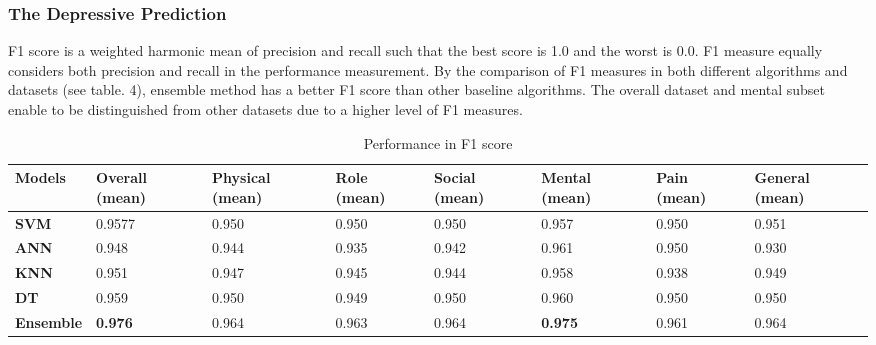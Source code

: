 \documentclass[10pt,journal,compsoc]{IEEEtran}
\begin{document}
\subsubsection{The Depressive Prediction}
F1 score is a weighted harmonic mean of precision and recall such that the best score is 1.0 and the worst is 0.0. F1 measure equally considers both precision and recall in the performance measurement. By the comparison of F1 measures in both different algorithms and datasets (see table. 4), ensemble method has a better F1 score than other baseline algorithms. The overall dataset and mental subset enable to be distinguished from other datasets due to a higher level of F1 measures.
\begin{table}[ht]
\begin{adjustwidth}{-1.5cm}{}
\begin{tabular}{|C{2cm}|C{1.5cm}|C{2cm}|C{1.5cm}|C{1.5cm}|C{1.5cm}|C{1.5cm}|C{2cm}|}
\hline
{} 
{\color[HTML]{333333} \textbf{Models}} & {\color[HTML]{333333} \textbf{Overall (mean)}} & {\color[HTML]{333333} \textbf{Physical (mean)}} & {\color[HTML]{333333} \textbf{Role (mean)}} &{\color[HTML]{333333} \textbf{Social (mean)}} & {\color[HTML]{333333} \textbf{Mental (mean)}} & {\color[HTML]{333333} \textbf{Pain (mean)}} & {\color[HTML]{333333} \textbf{General (mean)}} \\ \hline
{} 
\textbf{SVM} & 0.9577  & 0.950 & 0.950  & 0.950  & 0.957  & 0.950 & 0.951 \\ \hline
{} 
\textbf{ANN} & 0.948  & 0.944  & 0.935  & 0.942 & 0.961 & 0.950 & 0.930 \\ \hline
{} 
\textbf{KNN} & 0.951  & 0.947 & 0.945 & 0.944 & 0.958 & 0.938 & 0.949 \\ \hline
{} 
\textbf{DT} & 0.959 & 0.950  & 0.949 & 0.950  & 0.960  & 0.950 & 0.950  \\ \hline
{} 
\textbf{Ensemble}  & \textbf{0.976}  & 0.964  & 0.963  & 0.964 & \textbf{0.975} & 0.961 & 0.964  \\ \hline
\end{tabular}
\caption{Performance in F1 score}
\label{F1}
\end{adjustwidth}
\end{table}
\end{document}
